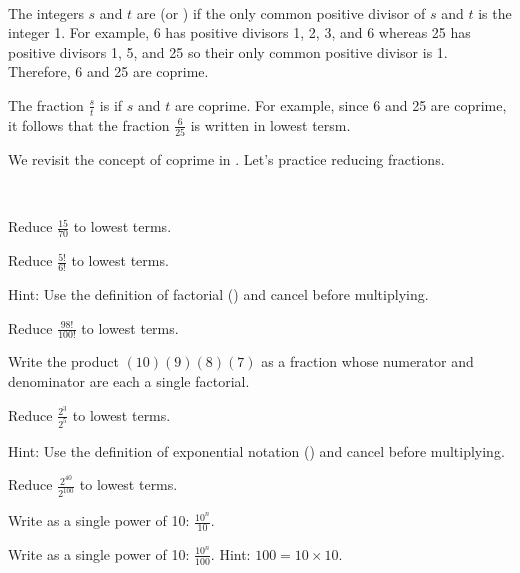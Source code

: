 \begin{defn}
\label{defn_lowest_terms}
~
    \begin{apart}
        \item The integers $s$ and $t$ are  (or ) if the only common positive divisor of $s$ and $t$ is the integer 1.  For example, 6 has positive divisors 1, 2, 3, and 6 whereas 25 has positive divisors 1, 5, and 25 so their only common positive divisor is 1.  Therefore, 6 and 25 are coprime.
        \item The fraction $\frac{s}{t}$ is  if $s$ and $t$ are coprime. For example, since 6 and 25 are coprime, it follows that the fraction $\frac{6}{25}$ is written in lowest tersm.
    \end{apart}
\end{defn}

We revisit the concept of coprime in .  Let's practice reducing fractions.

\begin{act}
\label{act_equiv_fractions}
~
    \begin{apart}
        \item Reduce $\displaystyle \frac{15}{70}$ to lowest terms.
        \item Reduce $\displaystyle\frac{5!}{6!}$ to lowest terms. 
        
        Hint: Use the definition of factorial () and cancel before multiplying.
        \item Reduce $\displaystyle\frac{98!}{100!}$ to lowest terms.
        \item Write the product $(10)(9)(8)(7)$ as a fraction whose numerator and denominator are each a single factorial.        
        \item Reduce $\displaystyle\frac{2^3}{2^5}$ to lowest terms. 
        
        Hint: Use the definition of exponential notation () and cancel before multiplying.              
        \item Reduce $\displaystyle\frac{2^{40}}{2^{100}}$ to lowest terms.
        \item Write as a single power of 10:
        $\displaystyle\frac{10^n}{10}.$
        \item Write as a single power of 10:
        $\displaystyle\frac{10^n}{100}.$
        Hint: $100 = 10 \times 10$.
    \end{apart}
\end{act}

